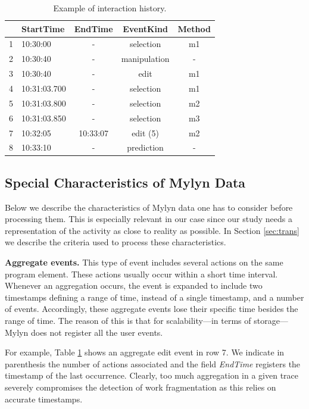 \documentclass[times]{smrauth}
\begin{document}
\begin{table}[ht!]
\small
\renewcommand{\arraystretch}{1.3}
\caption{ Example of interaction history. }
\label{tbl:sample_event}
\centering
\begin{tabular}{|c|l|c|c|c|} 
  \hline 
    & StartTime & EndTime & EventKind &  Method  \\
  \hline
  \hline
  1 & 10:30:00 & - & selection & m1  \\
  2 & 10:30:40 & - & manipulation & - \\
  3 & 10:30:40 & - & edit & m1  \\
  4 & 10:31:03.700 & - & selection & m1  \\
  5 & 10:31:03.800 & - & selection & m2  \\	  
  6 & 10:31:03.850 & - & selection & m3  \\	  
  7 & 10:32:05 & 10:33:07 & edit (5) & m2  \\	  
  8 & 10:33:10 & - & prediction & - \\
  \hline  
\end{tabular}
\end{table}



\subsection{Special Characteristics of Mylyn Data}
 Below we describe the characteristics of Mylyn data one has to consider before processing them. This is especially relevant in our case since our study needs a representation of the activity as close to reality as possible.  In Section \ref{sec:trans} we describe the criteria used to process these characteristics. 


\textbf{Aggregate events. } This type of event includes several actions on the same program element. These actions usually occur within a short time interval.  Whenever an aggregation occurs, the event is expanded to include two timestamps defining a range of time, instead of a single timestamp, and a number of events. Accordingly, these aggregate events lose their specific time besides the range of time. The reason of this is that for scalability---in terms of storage---Mylyn does not register all the user events.

For example, Table \ref{tbl:sample_event} shows an aggregate edit event in row 7. We indicate in parenthesis the number of actions associated and the field \textit{EndTime} registers the timestamp of the last occurrence. Clearly, too much aggregation in a given trace severely compromises the detection of work fragmentation as this relies on accurate timestamps.
\end{document}

